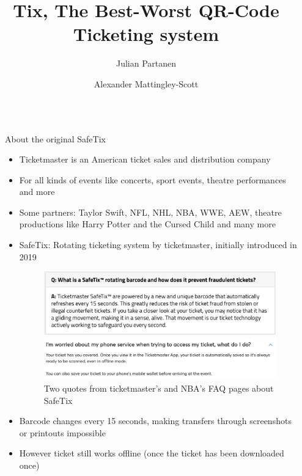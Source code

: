 \documentclass[final,dvipsnames]{beamer}
\title{\soutverythick{Safe}Tix, The Best-Worst QR-Code Ticketing system}
\author{ Julian Partanen \inst{1} \and Alexander Mattingley-Scott \inst{1}}
\institute[shortinst]{\inst{1} Heidelberg University}
\newlength{\sepwidth}
\newlength{\colwidth}
\newcommand{\separatorcolumn}{\begin{column}{\sepwidth}\end{column}}
\begin{document}
\begin{frame}[t, fragile]
\begin{columns}[t]
\separatorcolumn

\begin{column}{\colwidth}

    \begin{block}{About the original SafeTix}
        \begin{itemize}
            \item Ticketmaster is an American ticket sales and distribution company \cite{ticketmaster_wikipedia}
            \item For all kinds of events like concerts, sport events, theatre performances and more \cite{ticketmaster_wikipedia}
            \item Some partners: Taylor Swift, NFL, NHL, NBA, WWE, AEW, theatre productions like Harry Potter and the Cursed Child and many more \cite{ticketmaster_wikipedia}
            \item SafeTix: Rotating ticketing system by ticketmaster, initially introduced in 2019 \cite{introducing_safetix} \cite{ticketmaster_safetix_faq} \cite{nba_safetix_faq}
            \begin{figure}[h]
                \begin{center}
                    \includegraphics[width=\textwidth]{../figures/SafeTix_Quote_1.png}
                \end{center}
                \begin{center}
                    \includegraphics[width=\textwidth]{../figures/SafeTix_Quote_2.png}
                \end{center}
                \caption{Two quotes from ticketmaster's and NBA's FAQ pages about SafeTix \cite{ticketmaster_safetix_faq} \cite{nba_safetix_faq}}
                \label{fig:safetix_quotes}
            \end{figure}
            \item Barcode changes every 15 seconds, making transfers through screenshots or printouts impossible \cite{nba_safetix_faq}
            \item However ticket still works offline (once the ticket has been downloaded once) \cite{ticketmaster_safetix_faq}
        \end{itemize}


\end{block}
\end{column}
\end{columns}
\end{frame}
\end{document}
